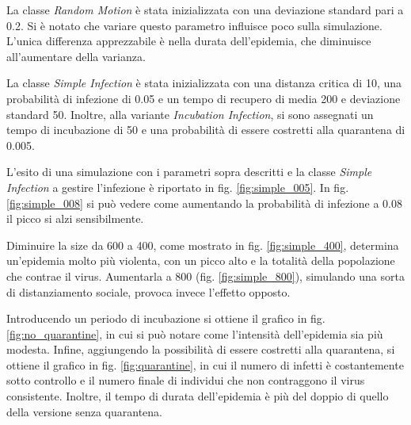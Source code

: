\documentclass[a4paper,10pt,twocolumn]{article}
\begin{document}
La classe \emph{Random Motion} è stata inizializzata con una deviazione standard pari a 0.2. Si è notato che variare questo parametro influisce poco sulla simulazione. L'unica differenza apprezzabile è nella durata dell'epidemia, che diminuisce all'aumentare della varianza.

La classe \emph{Simple Infection} è stata inizializzata con una distanza critica di 10, una probabilità di infezione di 0.05 e un tempo di recupero di media 200 e deviazione standard 50. Inoltre, alla variante \emph{Incubation Infection}, si sono assegnati un tempo di incubazione di 50 e una probabilità di essere costretti alla quarantena di 0.005.

L'esito di una simulazione con i parametri sopra descritti e la classe \emph{Simple Infection} a gestire l'infezione è riportato in fig. \ref{fig:simple_005}. In fig. \ref{fig:simple_008} si può vedere come aumentando la probabilità di infezione a 0.08 il picco si alzi sensibilmente.

Diminuire la size da 600 a 400, come mostrato in fig. \ref{fig:simple_400}, determina un'epidemia molto più violenta, con un picco alto e la totalità della popolazione che contrae il virus. Aumentarla a 800 (fig. \ref{fig:simple_800}), simulando una sorta di distanziamento sociale, provoca invece l'effetto opposto.

Introducendo un periodo di incubazione si ottiene il grafico in fig. \ref{fig:no_quarantine}, in cui si può notare come l'intensità dell'epidemia sia più modesta. Infine, aggiungendo la possibilità di essere costretti alla quarantena, si ottiene il grafico in fig. \ref{fig:quarantine}, in cui il numero di infetti è costantemente sotto controllo e il numero finale di individui che non contraggono il virus consistente. Inoltre, il tempo di durata dell'epidemia è più del doppio di quello della versione senza quarantena.
\end{document}
